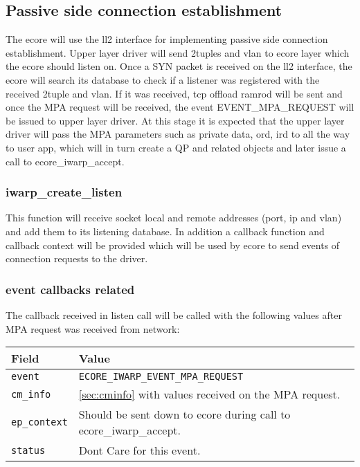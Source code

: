 \documentclass[11pt,fleqn,hidelinks,oneside]{book} %
\begin{document}
\subsection{Passive side connection establishment}
The ecore will use the ll2 interface for implementing passive side connection establishment. Upper layer driver will send 2\-tuples and vlan to ecore layer which the ecore should listen on. Once a SYN packet is received on the ll2 interface, the ecore will search its database to check if a listener was registered with the received 2\-tuple and vlan. If it was received, tcp offload ramrod will be sent and once the MPA request will be received, the event EVENT\_MPA\_REQUEST will be issued to upper layer driver. At this stage it is expected that the upper layer driver will pass the MPA parameters such as private data, ord, ird to all the way to user app, which will in turn create a QP and related objects and later issue a call to ecore\_iwarp\_accept.  
\subsubsection{iwarp\_create\_listen}
This function will receive socket local and remote addresses (port, ip and vlan) and add them to its listening database. In addition a callback function and callback context will be provided which will be used by ecore to send events of connection requests to the driver. 

\subsubsection{event callbacks related}
The callback received in listen call will be called with the following values after MPA request was received from network: \newline
\begin{tabular}{| l | p{10cm} |}
	\hline
	\textbf{Field} & \textbf{Value} \\ \hline
	\texttt{event} & \texttt{ECORE\_IWARP\_EVENT\_MPA\_REQUEST} \\ \hline
	\texttt{cm\_info} & \ref{sec:cminfo} with values received on the MPA request. \\ \hline
	\texttt{ep\_context} & Should be sent down to ecore during call to ecore\_iwarp\_accept. \\ \hline
	\texttt{status} & Dont Care for this event. \\ \hline
\end{tabular}
\end{document}
